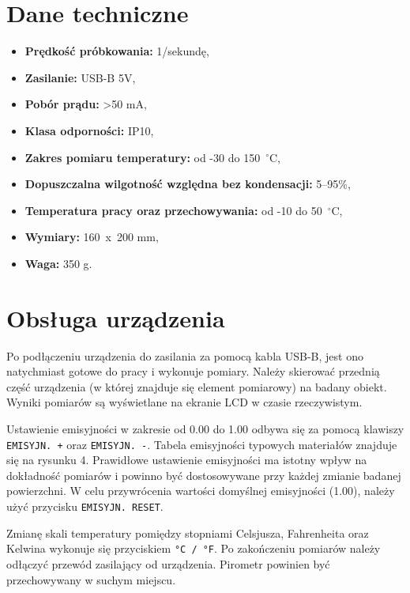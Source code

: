 \section{Dane techniczne}
\begin{itemize}
    \item \textbf{Prędkość próbkowania:} 1/sekundę,
    \item \textbf{Zasilanie:} USB-B 5V,
    \item \textbf{Pobór prądu:} >50 mA,
    \item \textbf{Klasa odporności:} IP10,
    \item \textbf{Zakres pomiaru temperatury:} od -30 do 150~$^{\circ}$C,
    \item \textbf{Dopuszczalna wilgotność względna bez kondensacji:} 5--95\%,
    \item \textbf{Temperatura pracy oraz przechowywania:} od -10 do 50~$^{\circ}$C,
    \item \textbf{Wymiary:} 160~x~200 mm,
    \item \textbf{Waga:} 350 g.
\end{itemize}

\newpage

\section{Obsługa urządzenia}
Po podłączeniu urządzenia do zasilania za pomocą kabla USB-B, jest ono natychmiast gotowe do pracy i wykonuje pomiary. Należy skierować przednią część urządzenia (w której znajduje się element pomiarowy) na badany obiekt. Wyniki pomiarów są wyświetlane na ekranie LCD w czasie rzeczywistym.

\vspace{12pt}

Ustawienie emisyjności w zakresie od 0.00 do 1.00 odbywa się za pomocą klawiszy \texttt{EMISYJN. +} oraz \texttt{EMISYJN. -}. Tabela emisyjności typowych materiałów znajduje się na rysunku 4. Prawidłowe ustawienie emisyjności ma istotny wpływ na dokładność pomiarów i powinno być dostosowywane przy każdej zmianie badanej powierzchni. W celu przywrócenia wartości domyślnej emisyjności (1.00), należy użyć przycisku \texttt{EMISYJN. RESET}.

\vspace{12pt}

Zmianę skali temperatury pomiędzy stopniami Celsjusza, Fahrenheita oraz Kelwina wykonuje się przyciskiem \texttt{°C / °F}. Po zakończeniu pomiarów należy odłączyć przewód zasilający od urządzenia. Pirometr powinien być przechowywany w suchym miejscu.

